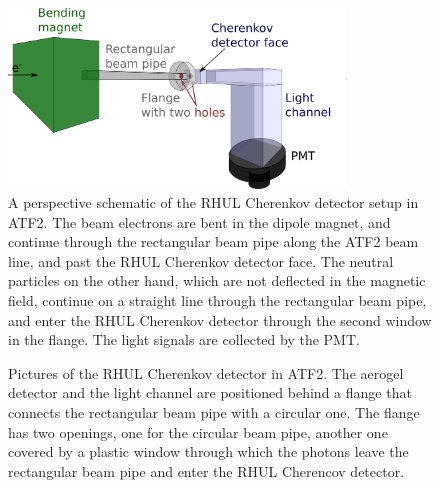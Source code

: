 \begin{figure}
\centering
\includegraphics[width=0.8\textwidth]{Figures/ATF/drawing_CherenkovSetup.png}
\caption[Schematic drawing of the RHUL Cherenkov detector setup]{A perspective schematic of the RHUL Cherenkov detector setup in ATF2.
The beam electrons are bent in the dipole magnet, and continue through the rectangular beam pipe along the ATF2 beam line, and past the RHUL Cherenkov detector face.
The neutral particles on the other hand, which are not deflected in the magnetic field, continue on a straight line through the rectangular beam pipe, and enter the RHUL Cherenkov detector through the second window in the flange. 
The light signals are collected by the PMT.}
\label{fig:RHUL_Cherenkov_Drawing}
\end{figure}

\begin{figure}
\begin{center}
\caption[Pictures of the RHUL Cherenkov detector]{Pictures of the RHUL Cherenkov detector in ATF2. 
The aerogel detector and the light channel are positioned behind a flange that connects the rectangular beam pipe with a circular one. 
The flange has two openings, one for the circular beam pipe, another one covered by a plastic window through which the photons leave the rectangular beam pipe and enter the RHUL Cherencov detector.}
\label{fig:RHUL_Cherenkov}
\end{center}
\end{figure}


